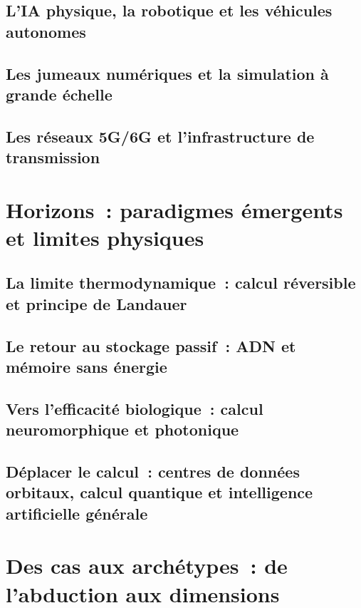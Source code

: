 \subsection{L'IA physique, la robotique et les véhicules autonomes}\label{subsec:physical_ai}

\subsection{Les jumeaux numériques et la simulation à grande échelle}\label{subsec:digital_twins}

\subsection{Les réseaux 5G/6G et l'infrastructure de transmission}\label{subsec:5g}


\section{Horizons~: paradigmes émergents et limites physiques}\label{sec:horizons}

\subsection{La limite thermodynamique~: calcul réversible et principe de Landauer}\label{subsec:reversible}

\subsection{Le retour au stockage passif~: ADN et mémoire sans énergie}\label{subsec:adn}

\subsection{Vers l'efficacité biologique~: calcul neuromorphique et photonique}\label{subsec:neuromorphique}

\subsection{Déplacer le calcul~: centres de données orbitaux, calcul quantique et intelligence artificielle générale}\label{subsec:deplacer}


\section{Des cas aux archétypes~: de l'abduction aux dimensions}\label{sec:reduction}